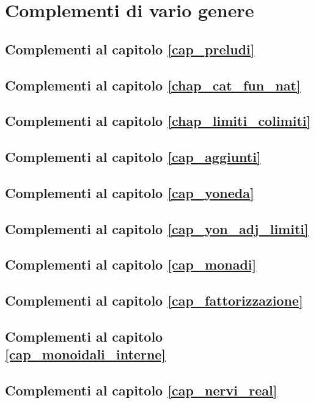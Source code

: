\chapter{Complementi di vario genere}
\section{Complementi al capitolo \ref{cap_preludi}}
\section{Complementi al capitolo \ref{chap_cat_fun_nat}}
\section{Complementi al capitolo \ref{chap_limiti_colimiti}}
\section{Complementi al capitolo \ref{cap_aggiunti}}
\section{Complementi al capitolo \ref{cap_yoneda}}
\section{Complementi al capitolo \ref{cap_yon_adj_limiti}}
\section{Complementi al capitolo \ref{cap_monadi}}
\section{Complementi al capitolo \ref{cap_fattorizzazione}}
\section{Complementi al capitolo \ref{cap_monoidali_interne}}
\section{Complementi al capitolo \ref{cap_nervi_real}}